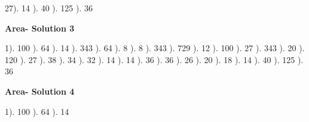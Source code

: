 \documentclass{article}%
\begin{document}
27). 14%
). 40%
). 125%
). 36%
\newline%
\newpage%
\large%
\begin{center}%
\textbf{Area- Solution 3}%
\newline%
\end{center} \normalsize%
1). 100%
). 64%
). 14%
). 343%
). 64%
). 8%
). 8%
). 343%
). 729%
). 12%
). 100%
). 27%
). 343%
). 20%
). 120%
). 27%
). 38%
). 34%
). 32%
). 14%
). 14%
). 36%
). 36%
). 26%
). 20%
). 18%
). 14%
). 40%
). 125%
). 36%
\newline%
\newpage%
\large%
\begin{center}%
\textbf{Area- Solution 4}%
\newline%
\end{center} \normalsize%
1). 100%
). 64%
). 14%
\newline%
\end{document}
